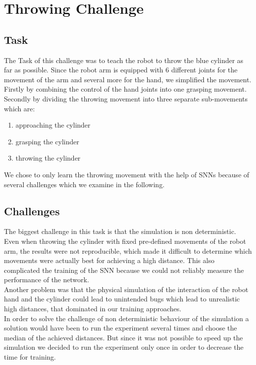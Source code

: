 \section{Throwing Challenge}
\subsection{Task}
The Task of this challenge was to teach the robot to throw the blue cylinder as far as possible. Since the robot arm is equipped with 6 different joints for the movement of the arm and several more for the hand, we simplified the movement. Firstly by combining the control of the hand joints into one grasping movement. Secondly by dividing the throwing movement into three separate sub-movements which are:
 \begin{enumerate}
\item approaching the cylinder
\item grasping the cylinder
\item throwing the cylinder
\end{enumerate}
We chose to only learn the throwing movement with the help of SNNs because of several challenges which we examine in the following.

\subsection{Challenges}
\label{sec:challenges}
The biggest challenge in this task is that the simulation is non deterministic. Even when throwing the cylinder with fixed pre-defined movements of the robot arm, the results were not reproducible, which made it difficult to determine which movements were actually best for achieving a high distance. This also complicated the training of the SNN because we could not reliably measure the performance of the network.\\
Another problem was that the physical simulation of the interaction of the robot hand and the cylinder could lead to unintended bugs which lead to unrealistic high distances, that dominated in our training approaches.\\
In order to solve the challenge of non deterministic behaviour of the simulation a solution would have been to run the experiment several times and choose the median of the achieved distances. But since it was not possible to speed up the simulation we decided to run the experiment only once in order to decrease the time for training.\\





